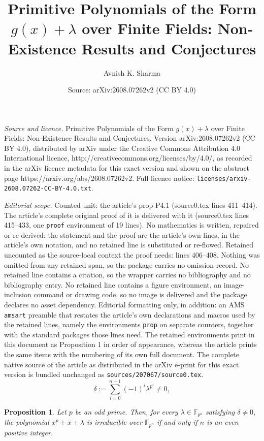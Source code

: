 \documentclass[10pt,a4paper]{amsart}
\title{Primitive Polynomials of the Form $g(x)+\lambda$ over Finite Fields: Non-Existence Results and Conjectures}
\author{Avnish K. Sharma}
\date{Source: arXiv:2608.07262v2 (CC BY 4.0)}
\newtheorem{prop}{Proposition}
\begin{document}
\maketitle

\noindent\emph{Source and licence.} Primitive Polynomials of the Form $g(x)+\lambda$ over Finite Fields: Non-Existence Results and Conjectures. Version arXiv:2608.07262v2 (CC BY 4.0), distributed by arXiv under the Creative Commons Attribution 4.0 International licence, http://creativecommons.org/licenses/by/4.0/, as recorded in the arXiv licence metadata for this exact version and shown on the abstract page https://arxiv.org/abs/2608.07262v2. Full licence notice: \texttt{licenses/arxiv-2608.07262-CC-BY-4.0.txt}.\par\smallskip

\noindent\textit{Editorial scope.} Counted unit: the article's prop P4.1 (source0.tex lines 411--414). The article's complete original proof of it is delivered with it (source0.tex lines 415--433, one \texttt{proof} environment of 19 lines). No mathematics is written, repaired or re-derived: the statement and the proof are the article's own lines, in the article's own notation, and no retained line is substituted or re-flowed.  Retained uncounted as the source-local context the proof needs: lines 406--408.  Nothing was omitted from any retained span, so the package carries no omission record.  No retained line contains a citation, so the wrapper carries no bibliography and no bibliography entry.  No retained line contains a figure environment, an image-inclusion command or drawing code, so no image is delivered and the package declares no asset dependency.  Editorial formatting only, in addition: an AMS \texttt{amsart} preamble that restates the article's own declarations and macros used by the retained lines, namely the environments \texttt{prop} on separate counters, together with the standard packages those lines need.  The retained environments print in this document as Proposition 1 in order of appearance, whereas the article prints the same items with the numbering of its own full document.  The complete native source of the article as distributed in the arXiv e-print for this exact version is bundled unchanged as \texttt{sources/207067/source0.tex}.
        \begin{equation}\label{delta}
            \delta:=\sum_{i=0}^{n-1}(-1)^i\lambda^{p^i}\neq 0,
        \end{equation}

        \begin{prop}\label{P4.1}
            Let $p$ be an odd prime. Then, for every $\lambda\in\mathbb{F}_{p^n}$ satisfying
            $\delta\neq 0,$ the polynomial $x^p+x+\lambda$ is irreducible over $\mathbb{F}_{p^n}$ if and only if $n$ is an even positive integer.
        \end{prop}
\end{document}
